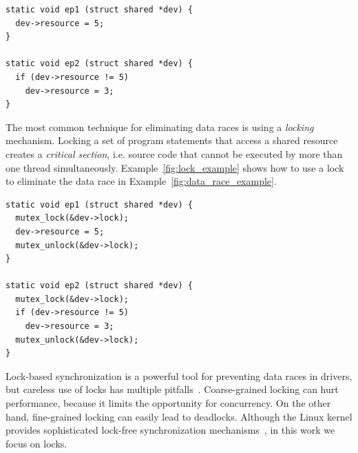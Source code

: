 \begin{lstlisting}[caption = Simple data race in a Linux driver \ADComment{I think the caption is misleading, since this is clearly not a driver}, label = fig:data_race_example]
static void ep1 (struct shared *dev) {
  dev->resource = 5;
}

static void ep2 (struct shared *dev) {
  if (dev->resource != 5)
    dev->resource = 3;
}
\end{lstlisting}

The most common technique for eliminating data races is using a \emph{locking} mechanism. Locking a set of program statements that access a shared resource creates a \emph{critical section}, i.e. source code that cannot be executed by more than one thread simultaneously. Example~\ref{fig:lock_example} shows how to use a lock to eliminate the data race in Example~\ref{fig:data_race_example}.

\begin{lstlisting}[caption = Using locks to eliminate the data race, label = fig:lock_example]
static void ep1 (struct shared *dev) {
  mutex_lock(&dev->lock);
  dev->resource = 5;
  mutex_unlock(&dev->lock);
}

static void ep2 (struct shared *dev) {
  mutex_lock(&dev->lock);
  if (dev->resource != 5)
    dev->resource = 3;
  mutex_unlock(&dev->lock);
}
\end{lstlisting}

Lock-based synchronization is a powerful tool for preventing data races in drivers, but careless use of locks has multiple pitfalls~\cite{sutter2005software}. Coarse-grained locking can  hurt performance, because it limits the opportunity for concurrency. On the other hand, fine-grained locking can easily lead to deadlocks.  
  Although the Linux kernel provides sophisticated lock-free synchronization mechanisms~\cite{corbet2005linux}, in this work we focus on locks.  

